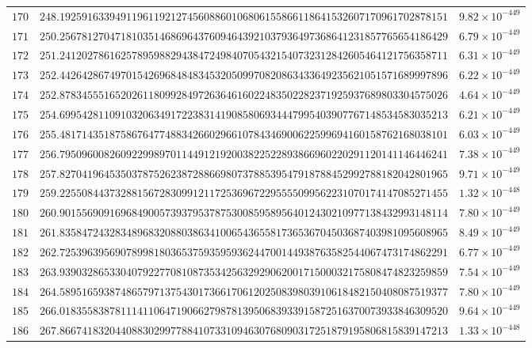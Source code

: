 \documentclass[12pt,reqno]{amsart}
\theoremstyle{plain}
\theoremstyle{definition}
\theoremstyle{remark}
\begin{document}
\begin{longtable}{clc}
$170$ & $248.1925916339491196119212745608860106806155866118641532607170961702878151$ & $9.82 \times 10^{-449}$ \\
$171$ & $250.2567812704718103514686964376094643921037936497368641231857765654186429$ & $6.79 \times 10^{-449}$ \\
$172$ & $251.2412027861625789598829438472498407054321540732312842605464121756358711$ & $6.31 \times 10^{-449}$ \\
$173$ & $252.4426428674970154269684848345320509970820863433649235621051571689997896$ & $6.22 \times 10^{-449}$ \\
$174$ & $252.8783455516520261180992849726364616022483502282371925937689803304575026$ & $4.64 \times 10^{-449}$ \\
$175$ & $254.6995428110910320634917223831419085806934447995403907767148534583035213$ & $6.21 \times 10^{-449}$ \\
$176$ & $255.4817143518758676477488342660296610784346900622599694160158762168038101$ & $6.03 \times 10^{-449}$ \\
$177$ & $256.7950960082609229989701144912192003822522893866960220291120141146446241$ & $7.38 \times 10^{-449}$ \\
$178$ & $257.8270419645350378752623872886698073788539547918788452992788182042801965$ & $9.71 \times 10^{-449}$ \\
$179$ & $259.2255084437328815672830991211725369672295555099562231070174147085271455$ & $1.32 \times 10^{-448}$ \\
$180$ & $260.9015569091696849005739379537875300859589564012430210977138432993148114$ & $7.80 \times 10^{-449}$ \\
$181$ & $261.8358472432834896832088038634100654365581736536704503687403981095608965$ & $8.49 \times 10^{-449}$ \\
$182$ & $262.7253963956907899818036537593595936244700144938763582544067473174862291$ & $6.77 \times 10^{-449}$ \\
$183$ & $263.9390328653304079227708108735342563292906200171500032175808474823259859$ & $7.54 \times 10^{-449}$ \\
$184$ & $264.5895165938748657971375430173661706120250839803910618482150408087519377$ & $7.80 \times 10^{-449}$ \\
$185$ & $266.0183558387811141106471906627987813950683933915872516370073933846309520$ & $9.64 \times 10^{-449}$ \\
$186$ & $267.8667418320440883029977884107331094630768090317251879195806815839147213$ & $1.33 \times 10^{-448}$ \\

\end{longtable}
\end{document}
